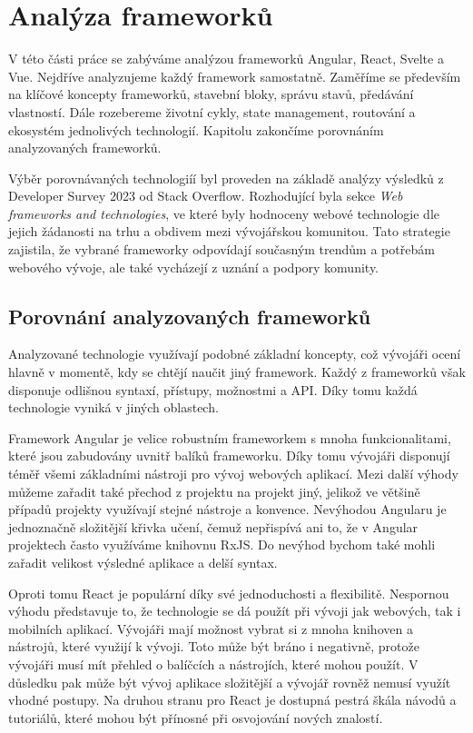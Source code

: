 \section{Analýza frameworků}

V této části práce se zabýváme analýzou frameworků Angular, React, Svelte a Vue. Nejdříve analyzujeme každý framework samostatně. 
Zaměříme se především na klíčové koncepty frameworků, stavební bloky, správu stavů, předávání vlastností. 
Dále rozebereme životní cykly, state management, routování a ekosystém jednolivých technologií. 
Kapitolu zakončíme porovnáním analyzovaných frameworků.

Výběr porovnávaných technologiíí byl proveden na základě analýzy výsledků z Developer Survey 2023 od Stack Overflow. 
Rozhodující byla sekce \emph{Web frameworks and technologies}, ve které byly hodnoceny webové technologie dle jejich žádanosti na trhu a obdivem mezi vývojářskou komunitou. 
Tato strategie zajistila, že vybrané frameworky odpovídají současným trendům a potřebám webového vývoje, ale také vycházejí z uznání a podpory komunity.\cite{stackoverflow, developersurvey}







\subsection{Porovnání analyzovaných frameworků}

Analyzované technologie využívají podobné základní koncepty, což vývojáři ocení hlavně v momentě, kdy se chtějí naučit jiný framework. 
Každý z frameworků však disponuje odlišnou syntaxí, přístupy, možnostmi a API. Díky tomu každá technologie vyniká v jiných oblastech.

Framework Angular je velice robustním frameworkem s mnoha funkcionalitami, které jsou zabudovány uvnitř balíků frameworku. 
Díky tomu vývojáři disponují téměř všemi základními nástroji pro vývoj webových aplikací. 
Mezi další výhody můžeme zařadit také přechod z projektu na projekt jiný, jelikož ve většině případů projekty využívají stejné nástroje a konvence. 
Nevýhodou Angularu je jednoznačně složitější křivka učení, čemuž nepřispívá ani to, že v Angular projektech často využíváme knihovnu RxJS. 
Do nevýhod bychom také mohli zařadit velikost výsledné aplikace a delší syntax.

Oproti tomu React je populární díky své jednoduchosti a flexibilitě. 
Nespornou výhodu představuje to, že technologie se dá použít při vývoji jak webových, tak i mobilních aplikací. 
Vývojáři mají možnost vybrat si z mnoha knihoven a nástrojů, které využijí k vývoji. 
Toto může být bráno i negativně, protože vývojáři musí mít přehled o balíčcích a nástrojích, které mohou použít. 
V důsledku pak může být vývoj aplikace složitější a vývojář rovněž nemusí využít vhodné postupy. 
Na druhou stranu pro React je dostupná pestrá škála návodů a tutoriálů, které mohou být přínosné při osvojování nových znalostí.

